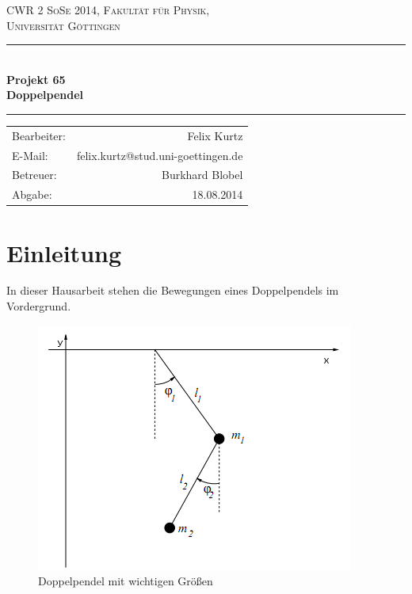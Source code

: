 \documentclass[12pt,a4paper,titlepage,headinclude,bibtotoc]{scrartcl}
\begin{document}
\begin{titlepage}
\centering
\textsc{\Large CWR 2 SoSe 2014, Fakultät für
  Physik,\\[1.5ex] Universität Göttingen}

\vspace*{4.2cm}

\rule{\textwidth}{1pt}\\[0.5cm]
{\huge \bfseries
  Projekt 65\\[1.5ex]
  Doppelpendel}\\[0.5cm]
\rule{\textwidth}{1pt}

\vspace*{3.0cm}

\begin{Large}
\begin{tabular}{lr}
 Bearbeiter:  &  Felix Kurtz\\
 E-Mail: &  felix.kurtz@stud.uni-goettingen.de\\
 Betreuer: & Burkhard Blobel \\
 Abgabe: & 18.08.2014\\
\end{tabular}
\end{Large}

\vspace*{0.8cm}
\begin{Large}
\end{Large}

\end{titlepage}

\tableofcontents

\newpage

\section{Einleitung}
\label{sec:einleitung}
In dieser Hausarbeit stehen die Bewegungen eines Doppelpendels im Vordergrund.\\

\begin{figure}[!htb]
	\centering	
	\includegraphics[scale=0.8]{doppelpendel.png}
	\caption{Doppelpendel mit wichtigen Größen \protect\footnotemark}
\end{figure}
\end{document}
